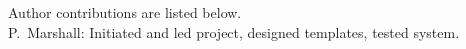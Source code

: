Author contributions are listed below. \\
P.~Marshall: Initiated and led project, designed templates, tested system. \\
